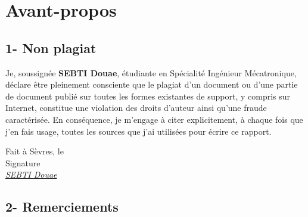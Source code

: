 \chapter*{Avant-propos}

\section*{1- Non plagiat}
Je, soussignée \textbf{SEBTI Douae}, étudiante en Spécialité Ingénieur
Mécatronique, déclare être pleinement consciente que le plagiat d'un document ou
d'une partie de document publié sur toutes les formes existantes de support, y
compris sur Internet, constitue une violation des droits d'auteur ainsi qu'une
fraude caractérisée. En conséquence, je m'engage à citer explicitement, à chaque
fois que j'en fais usage, toutes les sources que j'ai utilisées pour écrire ce
rapport.

\vspace{0.8cm}
Fait à Sèvres, le \\
Signature\\
\textit{\underline{SEBTI Douae}}

\section*{2- Remerciements}
